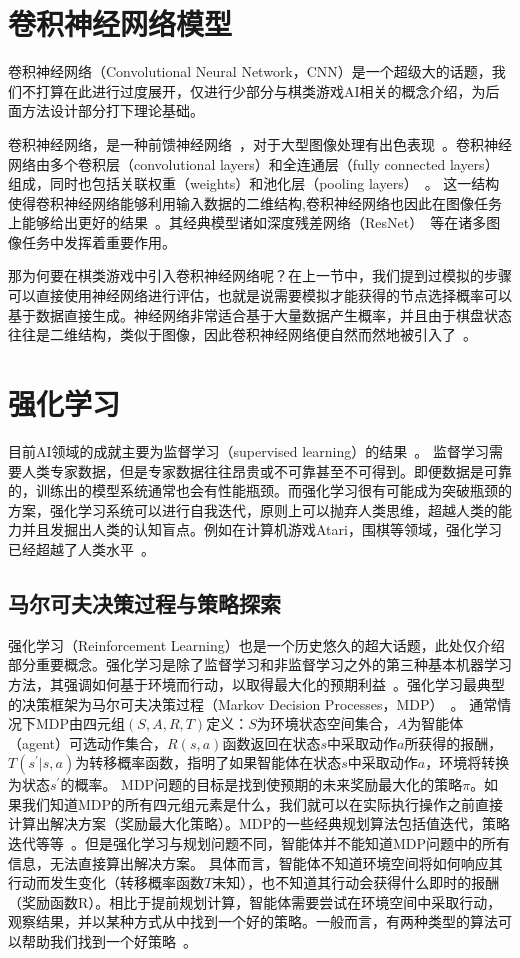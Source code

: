 \section{卷积神经网络模型}
卷积神经网络（Convolutional Neural Network，CNN）是一个超级大的话题，我们不打算在此进行过度展开，仅进行少部分与棋类游戏AI相关的概念介绍，为后面方法设计部分打下理论基础。

卷积神经网络，是一种前馈神经网络~\cite{SCHMIDHUBER201585}，对于大型图像处理有出色表现~\cite{NIPS2012_4824}。卷积神经网络由多个卷积层（convolutional layers）和全连通层（fully connected layers）组成，同时也包括关联权重（weights）和池化层（pooling layers）~\cite{venkatesan2017convolutional}。
这一结构使得卷积神经网络能够利用输入数据的二维结构,卷积神经网络也因此在图像任务上能够给出更好的结果~\cite{VALUEVA2020232}。其经典模型诸如深度残差网络（ResNet）~\cite{resnet}等在诸多图像任务中发挥着重要作用。

那为何要在棋类游戏中引入卷积神经网络呢？在上一节中，我们提到过模拟的步骤可以直接使用神经网络进行评估，也就是说需要模拟才能获得的节点选择概率可以基于数据直接生成。神经网络非常适合基于大量数据产生概率，并且由于棋盘状态往往是二维结构，类似于图像，因此卷积神经网络便自然而然地被引入了~\cite{Silver1140,Silver2017,Silver2016}。

\section{强化学习}
目前AI领域的成就主要为监督学习（supervised learning）的结果~\cite{hastie2009elements,NIPS2012_4824,lecun2015deep,resnet}。
监督学习需要人类专家数据，但是专家数据往往昂贵或不可靠甚至不可得到。即便数据是可靠的，训练出的模型系统通常也会有性能瓶颈。而强化学习很有可能成为突破瓶颈的方案，强化学习系统可以进行自我迭代，原则上可以抛弃人类思维，超越人类的能力并且发掘出人类的认知盲点。例如在计算机游戏Atari，围棋等领域，强化学习已经超越了人类水平~\cite{Silver2016}。
\subsection{马尔可夫决策过程与策略探索}
强化学习（Reinforcement Learning）也是一个历史悠久的超大话题，此处仅介绍部分重要概念。强化学习是除了监督学习和非监督学习之外的第三种基本机器学习方法，其强调如何基于环境而行动，以取得最大化的预期利益~\cite{Sutton1998}。强化学习最典型的决策框架为马尔可夫决策过程（Markov Decision Processes，MDP）~\cite{Bel}。
通常情况下MDP由四元组$(S,A,R,T)$定义：$S$为环境状态空间集合，$A$为智能体（agent）可选动作集合，$R(s,a)$函数返回在状态$s$中采取动作$a$所获得的报酬，$T(s^{\prime}|s,a)$为转移概率函数，指明了如果智能体在状态$s$中采取动作$a$，环境将转换为状态$s^{\prime}$的概率。
MDP问题的目标是找到使预期的未来奖励最大化的策略$\pi$。如果我们知道MDP的所有四元组元素是什么，我们就可以在实际执行操作之前直接计算出解决方案（奖励最大化策略）。MDP的一些经典规划算法包括值迭代，策略迭代等等~\cite{Sutton1998}。但是强化学习与规划问题不同，智能体并不能知道MDP问题中的所有信息，无法直接算出解决方案。
具体而言，智能体不知道环境空间将如何响应其行动而发生变化（转移概率函数$T$未知），也不知道其行动会获得什么即时的报酬（奖励函数R）。相比于提前规划计算，智能体需要尝试在环境空间中采取行动，观察结果，并以某种方式从中找到一个好的策略。一般而言，有两种类型的算法可以帮助我们找到一个好策略~\cite{rlbase}。

